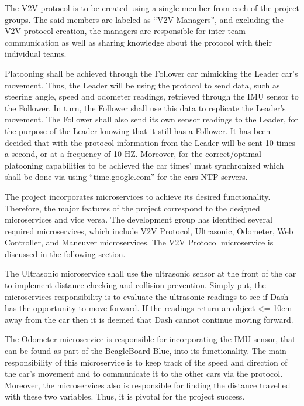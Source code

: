 \documentclass[12pt]{article}
\begin{document}
The V2V protocol is to be created using a single member from each of the project groups. The said members are labeled as “V2V Managers”, and excluding the V2V protocol creation, the managers are responsible for inter-team communication as well as sharing knowledge about the protocol with their individual teams. \par

Platooning shall be achieved through the Follower car mimicking the Leader car’s movement. Thus, the Leader will be using the protocol to send data, such as steering angle, speed and odometer readings, retrieved through the IMU sensor to the Follower. In turn, the Follower shall use this data to replicate the Leader’s movement. The Follower shall also send its own sensor readings to the Leader, for the purpose of the Leader knowing that it still has a Follower. It has been decided that with the protocol information from the Leader will be sent 10 times a second, or at a frequency of 10 HZ. Moreover, for the correct/optimal platooning capabilities to be achieved the car times’ must synchronized which shall be done via using “time.google.com” for the cars NTP servers.\par
The project incorporates microservices to achieve its desired functionality. Therefore, the major features of the project correspond to the designed microservices and vice versa. The development group has identified several required microservices, which include V2V Protocol, Ultrasonic, Odometer, Web Controller, and Maneuver microservices. The V2V Protocol microservice is discussed in the following section. \par

The Ultrasonic microservice shall use the ultrasonic sensor at the front of the car to implement distance checking and collision prevention. Simply put, the microservices responsibility is to evaluate the ultrasonic readings to see if Dash has the opportunity to move forward. If the readings return an object <= 10cm away from the car then it is deemed that Dash cannot continue moving forward. \par

The Odometer microservice is responsible for incorporating the IMU sensor, that can be found as part of the BeagleBoard Blue, into its functionality. The main responsibility of this microservice is to keep track of the speed and direction of the car’s movement and to communicate it to the other cars via the protocol. Moreover, the microservices also is responsible for finding the distance travelled with these two variables. Thus, it is pivotal for the project success. \par
\end{document}
